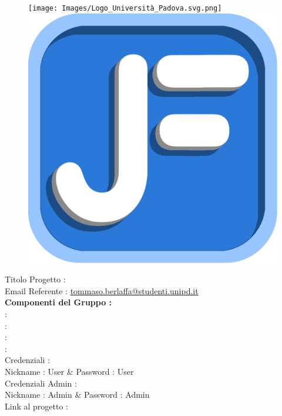 \documentclass[12pt, a4paper,table]{article}
\title{\textsc{\docNome}}
\date{}
\begin{document}
	\maketitle
	\begin{center}
    \begin{figure}[h]
      \texttt{[image: Images/Logo\_Università\_Padova.svg.png]}
      \includegraphics[scale=0.1,right]{Images/JF_1200.png}
    \end{figure}
    Titolo Progetto : \huge{\titoloProgetto}
		\\
		\vspace{1em}
		\normalsize Email Referente :  \href{mailto:tommaso.berlaffa@studenti.unipd.it}{tommaso.berlaffa@studenti.unipd.it}\\
		
		\vspace{2em}
		\textbf{Componenti del Gruppo :}
		\vspace{0.5em}
		\\ \Tber : \MatT
		\vspace{0.5em}
		\\ \Mspa : \MatM
		\vspace{0.5em}
		\\ \Plau : \MatP
		\vspace{0.5em}
		\\ \Amat : \MatA
    \vspace{0.5em}
		\\ Credenziali :
    \\ Nickname : User \&
     Password : User
    \vspace{0.5em}
    \\ Credenziali Admin :
    \\ Nickname : Admin \&
     Password : Admin
    \vspace{0.5em}
    \\ Link al progetto : 

    
	\end{center}
\end{document}
